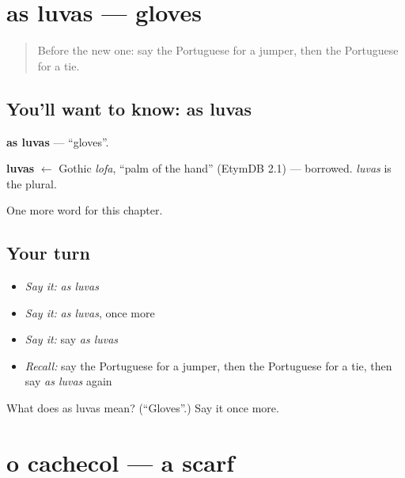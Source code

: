 \section[as luvas]{as luvas — gloves}

\label{lesson:PT-C103-luvas}



\begin{quote}
Before the new one: say the Portuguese for a jumper, then the Portuguese for a tie.
\end{quote}

\subsection*{You'll want to know: as luvas}
\textbf{as luvas} — \textquotedblleft{}gloves\textquotedblright{}.

\begin{cousinweb}
\textbf{luvas} $\leftarrow$ Gothic \emph{lofa}, \textquotedblleft{}palm of the hand\textquotedblright{} (EtymDB 2.1) — borrowed. \emph{luvas} is the plural.
\end{cousinweb}

\begin{grammarlens}[title={What you've built}]
One more word for this chapter.
\end{grammarlens}

\subsection*{Your turn}
\begin{itemize}
\raggedright
  \item \emph{Say it:} \emph{as luvas}
  \item \emph{Say it:} \emph{as luvas}, once more
  \item \emph{Say it:} say \emph{as luvas}
  \item \emph{Recall:} say the Portuguese for a jumper, then the Portuguese for a tie, then say \emph{as luvas} again
\end{itemize}

\begin{tcolorbox}[breakable,colback=teal!4,colframe=teal!35!black,title={Before you move on}]
What does as luvas mean? (\textquotedblleft{}Gloves\textquotedblright{}.) Say it once more.
\end{tcolorbox}
\section[o cachecol]{o cachecol — a scarf}

